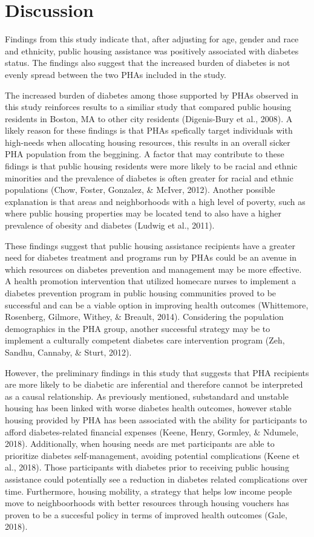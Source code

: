 \documentclass [11pt, proquest] {uwthesis}[2015/03/03]
\begin{document}
\section{Discussion}\label{discussion-1}

Findings from this study indicate that, after adjusting for age, gender
and race and ethnicity, public housing assistance was positively
associated with diabetes status. The findings also suggest that the
increased burden of diabetes is not evenly spread between the two PHAs
included in the study.

The increased burden of diabetes among those supported by PHAs observed
in this study reinforces results to a similiar study that compared
public housing residents in Boston, MA to other city residents
(Digenis-Bury et al., 2008). A likely reason for these findings is that
PHAs spefically target individuals with high-needs when allocating
housing resources, this results in an overall sicker PHA population from
the beggining. A factor that may contribute to these fidings is that
public housing residents were more likely to be racial and ethnic
minorities and the prevalence of diabetes is often greater for racial
and ethnic populations (Chow, Foster, Gonzalez, \& McIver, 2012).
Another possible explanation is that areas and neighborhoods with a high
level of poverty, such as where public housing properties may be located
tend to also have a higher prevalence of obesity and diabetes (Ludwig et
al., 2011).

These findings suggest that public housing assistance recipients have a
greater need for diabetes treatment and programs run by PHAs could be an
avenue in which resources on diabetes prevention and management may be
more effective. A health promotion intervention that utilized homecare
nurses to implement a diabetes prevention program in public housing
communities proved to be successful and can be a viable option in
improving health outcomes (Whittemore, Rosenberg, Gilmore, Withey, \&
Breault, 2014). Considering the population demographics in the PHA
group, another successful strategy may be to implement a culturally
competent diabetes care intervention program (Zeh, Sandhu, Cannaby, \&
Sturt, 2012).

However, the preliminary findings in this study that suggests that PHA
recipients are more likely to be diabetic are inferential and therefore
cannot be interpreted as a causal relationship. As previously mentioned,
substandard and unstable housing has been linked with worse diabetes
health outcomes, however stable housing provided by PHA has been
associated with the ability for participants to afford diabetes-related
financial expenses (Keene, Henry, Gormley, \& Ndumele, 2018).
Additionally, when housing needs are met participants are able to
prioritize diabetes self-management, avoiding potential complications
(Keene et al., 2018). Those participants with diabetes prior to
receiving public housing assistance could potentially see a reduction in
diabetes related complications over time. Furthermore, housing mobility,
a strategy that helps low income people move to neighboorhoods with
better resources through housing vouchers has proven to be a succesful
policy in terms of improved health outcomes (Gale, 2018).
\end{document}
